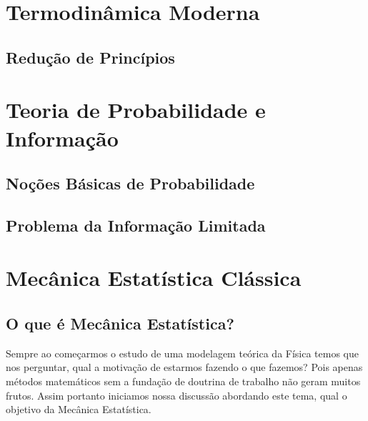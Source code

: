 \documentclass[twoside]{amsart}
\numberwithin{equation}{section}
\begin{document}

\section{Termodinâmica Moderna}

\subsection{Redução de Princípios}



\section{Teoria de Probabilidade e Informação}

\subsection{Noções Básicas de Probabilidade}

\subsection{Problema da Informação Limitada}



\section{Mecânica Estatística Clássica}

\subsection{O que é Mecânica Estatística?}

Sempre ao começarmos o estudo de uma modelagem teórica da Física temos que nos perguntar, qual a motivação de estarmos fazendo o que fazemos? Pois apenas métodos matemáticos sem a fundação de doutrina de trabalho não geram muitos frutos. Assim portanto iniciamos nossa discussão abordando este tema, qual o objetivo da Mecânica Estatística.
\end{document}
